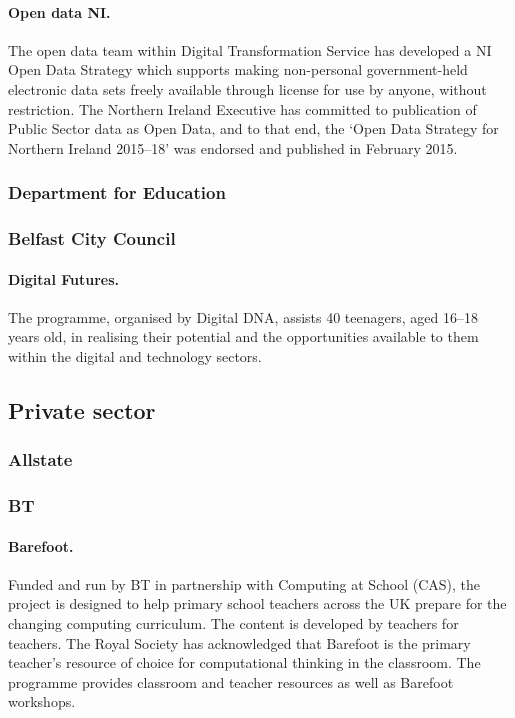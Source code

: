 \paragraph{Open data NI.} The open data team within Digital Transformation Service has developed a NI Open Data Strategy which supports making non-personal government-held electronic data sets freely available through license for use by anyone, without restriction. The Northern Ireland Executive has committed to publication of Public Sector data as Open Data, and to that end, the `Open Data Strategy for Northern Ireland 2015–18' was endorsed and published in February 2015.

\subsubsection{Department for Education}

\subsubsection{Belfast City Council}

\paragraph{Digital Futures.} The programme, organised by Digital DNA, assists 40 teenagers, aged 16--18 years old, in realising their potential and the opportunities available to them within the digital and technology sectors. 

\subsection{Private sector}

\subsubsection{Allstate}

\subsubsection{BT}

\paragraph{Barefoot.} Funded and run by BT in partnership with Computing at School (CAS), the project is designed to help primary school teachers across the UK prepare for the changing computing curriculum. The content is developed by teachers for teachers. The Royal Society has acknowledged that Barefoot is the primary teacher's resource of choice for computational thinking in the classroom. The programme provides classroom and teacher resources as well as Barefoot workshops.

